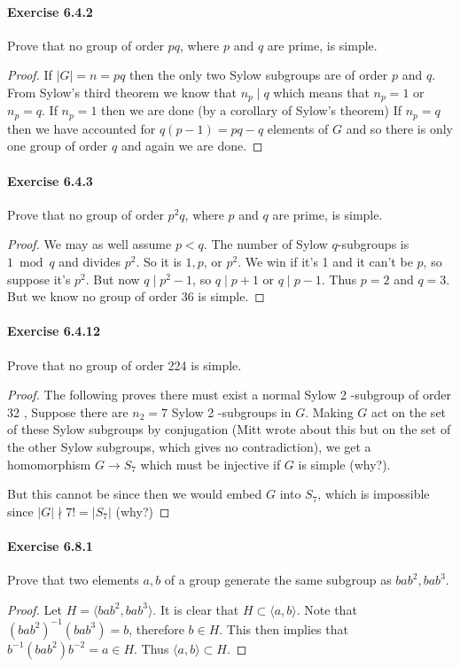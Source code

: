 \documentclass{article}
\begin{document}
\paragraph{Exercise 6.4.2} Prove that no group of order $p q$, where $p$ and $q$ are prime, is simple.
\begin{proof}
    If $|G|=n=p q$ then the only two Sylow subgroups are of order $p$ and $q$.
From Sylow's third theorem we know that $n_p \mid q$ which means that $n_p=1$ or $n_p=q$.
If $n_p=1$ then we are done (by a corollary of Sylow's theorem)
If $n_p=q$ then we have accounted for $q(p-1)=p q-q$ elements of $G$ and so there is only one group of order $q$ and again we are done.
\end{proof}



\paragraph{Exercise 6.4.3} Prove that no group of order $p^2 q$, where $p$ and $q$ are prime, is simple.
\begin{proof}
    We may as well assume $p<q$. The number of Sylow $q$-subgroups is $1 \bmod q$ and divides $p^2$. So it is $1, p$, or $p^2$. We win if it's 1 and it can't be $p$, so suppose it's $p^2$. But now $q \mid p^2-1$, so $q \mid p+1$ or $q \mid p-1$.
Thus $p=2$ and $q=3$. But we know no group of order 36 is simple. 
\end{proof}



\paragraph{Exercise 6.4.12} Prove that no group of order 224 is simple.
\begin{proof}
    The following proves there must exist a normal Sylow 2 -subgroup of order 32 ,
Suppose there are $n_2=7$ Sylow 2 -subgroups in $G$. Making $G$ act on the set of these Sylow subgroups by conjugation (Mitt wrote about this but on the set of the other Sylow subgroups, which gives no contradiction), we get a homomorphism $G \rightarrow S_7$ which must be injective if $G$ is simple (why?).

But this cannot be since then we would embed $G$ into $S_7$, which is impossible since $|G| \nmid 7 !=\left|S_7\right|$ (why?)
\end{proof}



\paragraph{Exercise 6.8.1} Prove that two elements $a, b$ of a group generate the same subgroup as $b a b^2, b a b^3$.
\begin{proof}
    Let $H = \langle bab^2, bab^3\rangle$. It is clear that $H\subset \langle a, b\rangle$. Note that $(bab^2)^{-1}(bab^3)=b$, therefore $b\in H$. This then implies that $b^{-1}(bab^2)b^{-2}=a\in H$. Thus $\langle a, b\rangle\subset H$.  
\end{proof}
\end{document}

